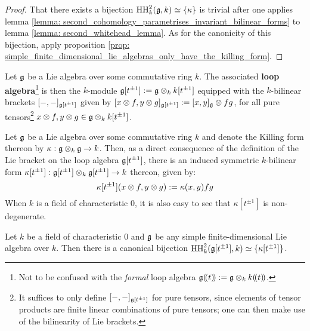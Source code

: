                 \begin{proof}
                    That there exists a bijection $\mathrm{HH}^2_k(\mathfrak{g}, k) \simeq \{\kappa\}$ is trivial after one applies lemma \ref{lemma: second_cohomology_parametrises_invariant_bilinear_forms} to lemma \ref{lemma: second_whitehead_lemma}. As for the canonicity of this bijection, apply proposition \ref{prop: simple_finite_dimensional_lie_algebras_only_have_the_killing_form}.
                \end{proof}
                
            \begin{definition} \label{def: loop_algebras}
                Let $\mathfrak{g}$ be a Lie algebra over some commutative ring $k$. The associated \textbf{loop algebra}\footnote{Not to be confused with the \textit{formal} loop algebra $\g(\!(t)\!) := \g \tensor_k k(\!(t)\!)$.} is then the $k$-module $\g[t^{\pm 1}] := \g \tensor_k k[t^{\pm 1}]$ equipped with the $k$-bilinear brackets $[-, -]_{\mathfrak{g}[t^{\pm 1}]}$ given by $[x \tensor f, y \tensor g]_{\g[t^{\pm 1}]} := [x, y]_{\g} \tensor fg$, for all pure tensors\footnote{It suffices to only define $[-, -]_{\mathfrak{g}[t^{\pm 1}]}$ for pure tensors, since elements of tensor products are finite linear combinations of pure tensors; one can then make use of the bilinearity of Lie brackets.} $x \tensor f, y \tensor g \in \g \tensor_k k[t^{\pm 1}]$.
            \end{definition}
            \begin{remark} \label{remark: killing_forms_on_loop_algebras}
                Let $\mathfrak{g}$ be a Lie algebra over some commutative ring $k$ and denote the Killing form thereon by $\kappa: \g \tensor_k \g \to k$. Then, as a direct consequence of the definition of the Lie bracket on the loop algebra $\mathfrak{g}[t^{\pm 1}]$, there is an induced symmetric $k$-bilinear form $\kappa[t^{\pm 1}]: \g[t^{\pm 1}] \tensor_k \g[t^{\pm 1}] \to k$ thereon, given by:
                    $$\kappa[t^{\pm 1}](x \tensor f, y \tensor g) := \kappa(x, y) fg$$
                When $k$ is a field of characteristic $0$, it is also easy to see that $\kappa[t^{\pm 1}]$ is non-degenerate. 
            \end{remark}
            \begin{proposition} \label{prop: principal_central_extensions_of_simply_affine_lie_algbebras_are_universal}
                Let $k$ be a field of characteristic $0$ and $\mathfrak{g}$ be any simple finite-dimensional Lie algebra over $k$. Then there is a canonical bijection $\mathrm{HH}^2_k(\mathfrak{g}[t^{\pm 1}], k) \simeq \{\kappa[t^{\pm 1}]\}$.
            \end{proposition}
